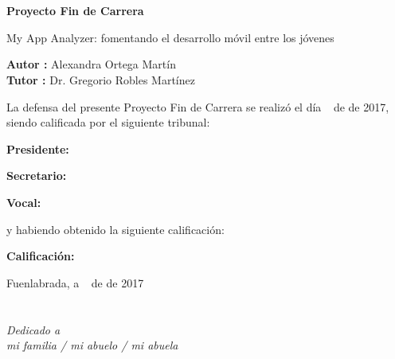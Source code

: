 \documentclass[a4paper, 12pt]{book}
\begin{document}
\clearpage
{}
\chapter*{}

\vspace{-4cm}
\begin{center}
\LARGE
\textbf{Proyecto Fin de Carrera}

\vspace{1cm}
\large
My App Analyzer: fomentando el desarrollo móvil entre los jóvenes

\vspace{1cm}
\large
\textbf{Autor :} Alexandra Ortega Martín \\
\textbf{Tutor :} Dr. Gregorio Robles Martínez

\end{center}

\vspace{1cm}
La defensa del presente Proyecto Fin de Carrera se realizó el día \qquad$\;\,$ de \qquad\qquad\qquad\qquad \newline de 2017, siendo calificada por el siguiente tribunal:


\vspace{0.5cm}
\textbf{Presidente:}

\vspace{1.2cm}
\textbf{Secretario:}

\vspace{1.2cm}
\textbf{Vocal:}


\vspace{1.2cm}
y habiendo obtenido la siguiente calificación:

\vspace{1cm}
\textbf{Calificación:}


\vspace{1cm}
\begin{flushright}
Fuenlabrada, a \qquad$\;\,$ de \qquad\qquad\qquad\qquad de 2017
\end{flushright}


\chapter*{}
\begin{flushright}
\textit{Dedicado a \\
mi familia / mi abuelo / mi abuela}
\end{flushright}
\end{document}
